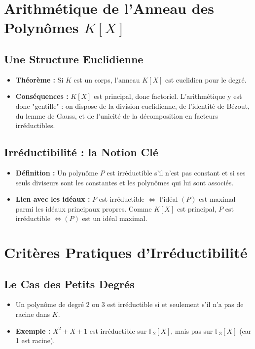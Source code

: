 \documentclass[12pt, a4paper, parskip=full]{report}
\theoremstyle{agregstyle}
\begin{document}
\section{Arithmétique de l'Anneau des Polynômes $K[X]$}
\subsection{Une Structure Euclidienne}
\begin{itemize}
    \item \textbf{Théorème :} Si $K$ est un corps, l'anneau $K[X]$ est euclidien pour le degré.
    \item \textbf{Conséquences :} $K[X]$ est principal, donc factoriel. L'arithmétique y est donc "gentille" : on dispose de la division euclidienne, de l'identité de Bézout, du lemme de Gauss, et de l'unicité de la décomposition en facteurs irréductibles.
\end{itemize}
\subsection{Irréductibilité : la Notion Clé}
\begin{itemize}
    \item \textbf{Définition :} Un polynôme $P$ est irréductible s'il n'est pas constant et si ses seuls diviseurs sont les constantes et les polynômes qui lui sont associés.
    \item \textbf{Lien avec les idéaux :} $P$ est irréductible $\iff$ l'idéal $(P)$ est maximal parmi les idéaux principaux propres. Comme $K[X]$ est principal, $P$ est irréductible $\iff (P)$ est un idéal maximal.
\end{itemize}

\section{Critères Pratiques d'Irréductibilité}
\subsection{Le Cas des Petits Degrés}
\begin{itemize}
    \item Un polynôme de degré 2 ou 3 est irréductible si et seulement s'il n'a pas de racine dans $K$.
    \item \textbf{Exemple :} $X^2+X+1$ est irréductible sur $\mathbb{F}_2[X]$, mais pas sur $\mathbb{F}_3[X]$ (car 1 est racine).
\end{itemize}
\end{document}
